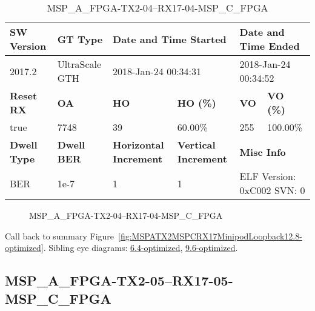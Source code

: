 \begin{table}[h]
\centering
\caption{MSP\_A\_FPGA-TX2-04--RX17-04-MSP\_C\_FPGA}
\label{tab:MSPAFPGATX204RX1704MSPCFPGA12.8-optimized}
\begin{tabular}{@{}|l|l|l|l|l|l|@{}}
\toprule
\textbf{SW Version}                & \textbf{GT Type}   & \multicolumn{2}{l|}{\textbf{Date and Time Started}}            & \multicolumn{2}{l|}{\textbf{Date and Time Ended}}        \\ \midrule
2017.2                       & UltraScale GTH          & \multicolumn{2}{l|}{2018-Jan-24 00:34:31}                   & \multicolumn{2}{l|}{2018-Jan-24 00:34:52}               \\ \midrule
\textbf{Reset RX}                  & \textbf{OA} & \textbf{HO}   & \textbf{HO (\%)} & \textbf{VO} & \textbf{VO (\%)} \\ \midrule
true & 7748        & 39          & 60.00\%        & 255        & 100.00\%       \\ \midrule
\textbf{Dwell Type}                & \textbf{Dwell BER} & \textbf{Horizontal Increment} & \textbf{Vertical Increment}    & \multicolumn{2}{l|}{\textbf{Misc Info}}                  \\ \midrule
BER                            & 1e-7        & 1        & 1           & \multicolumn{2}{l|}{ELF Version: 0xC002 SVN: 0}                         \\ \bottomrule
\end{tabular}
\end{table}

\begin{figure}[h]
\caption{MSP\_A\_FPGA-TX2-04--RX17-04-MSP\_C\_FPGA} \label{fig:MSPAFPGATX204RX1704MSPCFPGA12.8-optimized}
\end{figure}

Call back to summary Figure~\ref{fig:MSPATX2MSPCRX17MinipodLoopback12.8-optimized}.
Sibling eye diagrams: \hyperref[sec:MSPAFPGATX204RX1704MSPCFPGA6.4-optimized]{6.4-optimized}, \hyperref[sec:MSPAFPGATX204RX1704MSPCFPGA9.6-optimized]{9.6-optimized}.

\clearpage
\newpage


\subsection{MSP\_A\_FPGA-TX2-05--RX17-05-MSP\_C\_FPGA}\label{sec:MSPAFPGATX205RX1705MSPCFPGA12.8-optimized}

